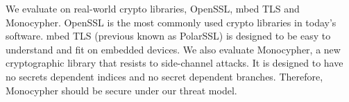 \begin{table}[h]
{\begin{tabular}{llrrrrrrr}
    \end{tabular}
    }
\end{table}

We evaluate \tool{} on real-world crypto libraries, OpenSSL, mbed TLS and Monocypher\@. 
OpenSSL is the most commonly used crypto libraries in today's software. mbed TLS\@
(previous known as PolarSSL) is designed to be easy to understand and fit on
embedded devices. We also evaluate Monocypher, a new cryptographic library that
resists to side-channel attacks. 
It is designed to have no 
secrets dependent indices and no secret dependent branches. Therefore,
Monocypher should be secure under our threat model.

